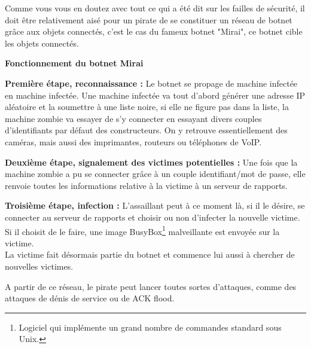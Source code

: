 \documentclass[a4paper]{report}
\begin{document}
	Comme vous vous en doutez avec tout ce qui a été dit sur les failles de sécurité, il doit être relativement aisé pour un pirate
	de se constituer un réseau de botnet grâce aux objets connectés, c'est le cas du fameux botnet "Mirai", ce botnet cible les objets
	connectés.
	
	\bigbreak
	
	\begin{flushleft}
		\textbf{Fonctionnement du botnet Mirai} \\
	\end{flushleft}
	
	\textbf{Première étape, reconnaissance :} Le botnet se propage de machine infectée en machine infectée. Une machine infectée 
	va tout d'abord générer une adresse IP aléatoire et la soumettre à une liste noire, si elle ne figure pas dans la liste, 
	la machine zombie va essayer de s'y connecter en essayant divers couples d'identifiants par défaut des constructeurs. On y retrouve 
	essentiellement des caméras, mais aussi des imprimantes, routeurs ou téléphones de VoIP.
	
	\medbreak

	\textbf{Deuxième étape, signalement des victimes potentielles :} Une fois que la machine zombie a pu se connecter grâce à un couple
	identifiant/mot de passe, elle renvoie toutes les informations relative à la victime à un serveur de rapports.
	
	\medbreak
	
	\textbf{Troisième étape, infection :} L'assaillant peut à ce moment là, si il le désire, se connecter au serveur de rapports et choisir
	ou non d'infecter la nouvelle victime. Si il choisit de le faire, une image
	BusyBox\footnote{Logiciel qui implémente un grand nombre de commandes standard sous Unix.} malveillante est envoyée sur la victime. \\
	La victime fait désormais partie du botnet et commence lui aussi à chercher de nouvelles victimes.
	
	\medbreak
	A partir de ce réseau, le pirate peut lancer toutes sortes d'attaques, comme des attaques de dénis de service ou de ACK flood.
	
\end{document}
